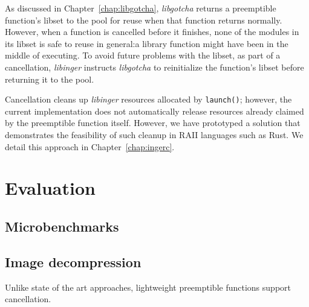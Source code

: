 As discussed in Chapter~\ref{chap:libgotcha}, \textit{libgotcha} returns a
preemptible function's libset to the pool for reuse when that function returns
normally.  However, when a function is cancelled before it finishes, none of the
modules in its libset is safe to reuse in general:\@ a library function might have
been in the middle of executing.  To avoid future problems with the libset, as part
of a cancellation, \textit{libinger} instructs \textit{libgotcha} to reinitialize the
function's libset before returning it to the pool.

Cancellation cleans up \textit{libinger} resources allocated by \texttt{launch()};
however, the current implementation does not automatically release resources already
claimed by the preemptible function itself.  However, we have prototyped a solution
that demonstrates the feasibility of such cleanup in RAII languages such as Rust.
We detail this approach in Chapter~\ref{chap:ingerc}.


\section{Evaluation}




\subsection{Microbenchmarks}




\subsection{Image decompression}

Unlike state of the art approaches, lightweight preemptible functions support
cancellation.
\begin{sloppypar}

\end{sloppypar}
